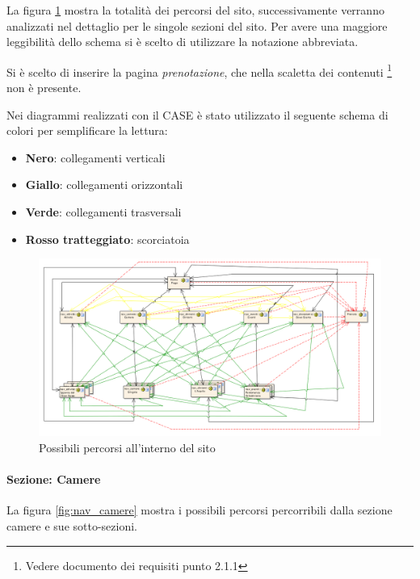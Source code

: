 \documentclass[a4paper,12pt,hidelinks]{report}
\begin{document}
La figura \ref{fig:navigazione} mostra la totalità dei percorsi del sito, successivamente verranno analizzati nel dettaglio per le singole sezioni del sito.
Per avere una maggiore leggibilità dello schema si è scelto di utilizzare la notazione abbreviata.
\par Si è scelto di inserire la pagina \textit{prenotazione}, che nella scaletta dei contenuti \footnote{Vedere documento dei requisiti punto 2.1.1} non è presente.
\par Nei diagrammi realizzati con il CASE è stato utilizzato il seguente schema di colori per semplificare la lettura:
\begin{itemize}
 \item \textbf{Nero}: collegamenti verticali
 \item \textbf{Giallo}: collegamenti orizzontali
 \item \textbf{Verde}: collegamenti trasversali
 \item \textbf{Rosso tratteggiato}: scorciatoia
\end{itemize}

\begin{figure}[h!]%
    \includegraphics[width=1.2\textwidth,keepaspectratio=true]{../img/navigazione}
    \centering
    \caption{Possibili percorsi all'interno del sito}%
    \label{fig:navigazione}%
\end{figure}

\newpage
\paragraph{Sezione: Camere}

La figura \ref{fig:nav_camere} mostra i possibili percorsi percorribili dalla sezione camere e sue sotto-sezioni.
\end{document}
